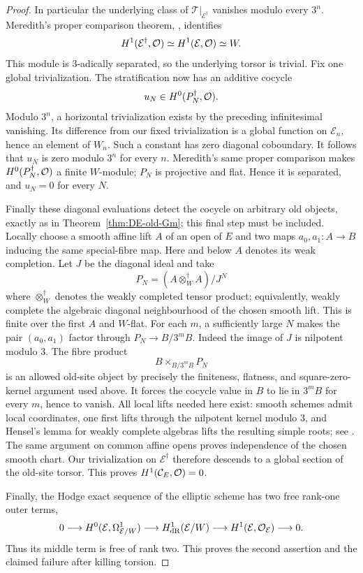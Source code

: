 \begin{proof}
In particular the underlying class of $\mathcal T|_{\mathcal E^\dagger}$ vanishes modulo every $3^n$.  Meredith's proper comparison theorem, \cite[\S5, Theorem~A, p.~25; or its projective Theorem~B]{Meredith1972}, identifies
\[
 H^1(\mathcal E^\dagger,\mathcal O)
                  \simeq H^1(\mathcal E,\mathcal O)\simeq W.
\]
This module is $3$-adically separated, so the underlying torsor is trivial.  Fix one global trivialization.  The stratification now has an additive cocycle
\[
                         u_N\in H^0(P_N^\dagger,\mathcal O).
\]
Modulo $3^n$, a horizontal trivialization exists by the preceding infinitesimal vanishing.  Its difference from our fixed trivialization is a global function on $\mathcal E_n$, hence an element of $W_n$.  Such a constant has zero diagonal coboundary.  It follows that $u_N$ is zero modulo $3^n$ for every $n$.  Meredith's same proper comparison makes $H^0(P_N^\dagger,\mathcal O)$ a finite $W$-module; $P_N$ is projective and flat.  Hence it is separated, and $u_N=0$ for every $N$.

Finally these diagonal evaluations detect the cocycle on arbitrary old objects, exactly as in Theorem~\ref{thm:DE-old-Gm}; this final step must be included.  Locally choose a smooth affine lift $A$ of an open of $E$ and two maps $a_0,a_1:A\to B$ inducing the same special-fibre map.  Here and below $A$ denotes its weak completion.  Let $J$ be the diagonal ideal and take
\[
                         P_N=(A\otimes_W^\dagger A)/J^N
\]
where $\otimes_W^\dagger$ denotes the weakly completed tensor product; equivalently, weakly complete the algebraic diagonal neighbourhood of the chosen smooth lift.  This is finite over the first $A$ and $W$-flat.  For each $m$, a sufficiently large $N$ makes the pair $(a_0,a_1)$ factor through $P_N\to B/3^mB$.  Indeed the image of $J$ is nilpotent modulo $3$.  The fibre product
\[
                         B\times_{B/3^mB}P_N
\]
is an allowed old-site object by precisely the finiteness, flatness, and square-zero-kernel argument used above.  It forces the cocycle value in $B$ to lie in $3^mB$ for every $m$, hence to vanish.  All local lifts needed here exist: smooth schemes admit local \etale coordinates, one first lifts through the nilpotent kernel modulo $3$, and Hensel's lemma for weakly complete algebras lifts the resulting simple roots; see \cite[Proposition~2.31 and the preceding very-smooth lifting discussion]{DavisLangerZink2012}.  The same argument on common affine opens proves independence of the chosen smooth chart.  Our trivialization on $\mathcal E^\dagger$ therefore descends to a global section of the old-site torsor.  This proves $H^1(\mathcal C_E,\mathcal O)=0$.

Finally, the Hodge exact sequence of the elliptic scheme has two free rank-one outer terms,
\[
 0\longrightarrow H^0(\mathcal E,\Omega^1_{\mathcal E/W})
  \longrightarrow H^1_{\mathrm{dR}}(\mathcal E/W)
  \longrightarrow H^1(\mathcal E,\mathcal O_{\mathcal E})\longrightarrow0.
\]
Thus its middle term is free of rank two.  This proves the second assertion and the claimed failure after killing torsion.
\end{proof}


